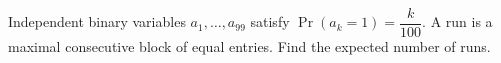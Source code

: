 Independent binary variables $a_1,\ldots,a_{99}$ satisfy $\Pr(a_k=1)=\dfrac{k}{100}$. A run is a maximal consecutive block of equal entries. Find the expected number of runs.
